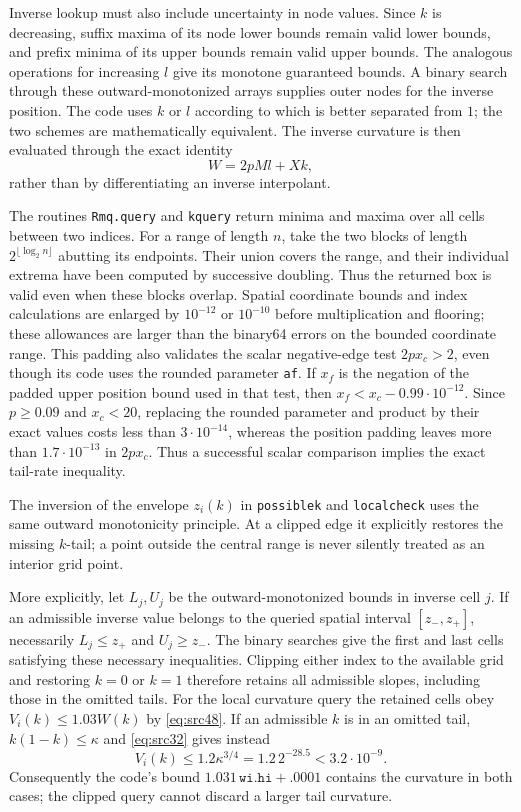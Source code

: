 \documentclass[11pt,a4paper]{article}
\numberwithin{equation}{section}
\theoremstyle{definition}
\theoremstyle{remark}
\begin{document}
Inverse lookup must also include uncertainty in node values.  Since $k$
is decreasing, suffix maxima of its node lower bounds remain valid lower
bounds, and prefix minima of its upper bounds remain valid upper bounds.
The analogous operations for increasing $l$ give its monotone guaranteed
bounds.  A binary search through these outward-monotonized arrays supplies
outer nodes for the inverse position.  The code uses $k$ or $l$ according to
which is better separated from $1$; the two schemes are mathematically
equivalent.  The inverse curvature is then evaluated through the exact
identity
\[
 W=2pMl+Xk,
\]
rather than by differentiating an inverse interpolant.

The routines \texttt{Rmq.query} and \texttt{kquery} return minima and maxima
over all cells between two indices.  For a range of length $n$, take the two
blocks of length $2^{\lfloor\log_2 n\rfloor}$ abutting its endpoints.  Their
union covers the range, and their individual extrema have been computed by
successive doubling.  Thus the returned box is valid even when these blocks
overlap.  Spatial coordinate bounds and index calculations are enlarged by
$10^{-12}$ or $10^{-10}$ before multiplication and flooring; these allowances
are larger than the binary64 errors on the bounded coordinate range.
This padding also validates the scalar negative-edge test
$2px_c>2$, even though its code uses the rounded parameter
\texttt{af}.  If $x_f$ is the negation of the padded upper position
bound used in that test, then $x_f<x_c-0.99\cdot10^{-12}$.
Since $p\ge0.09$ and $x_c<20$, replacing the rounded parameter and
product by their exact values costs less than $3\cdot10^{-14}$,
whereas the position padding leaves more than $1.7\cdot10^{-13}$
in $2px_c$.  Thus a successful scalar comparison implies the exact
tail-rate inequality.

The inversion of the envelope $z_i(k)$ in \texttt{possiblek} and
\texttt{localcheck} uses the same outward monotonicity principle.  At a clipped
edge it explicitly restores the missing $k$-tail; a point outside the central
range is never silently treated as an interior grid point.

More explicitly, let $L_j,U_j$ be the outward-monotonized bounds in inverse
cell $j$.  If an admissible inverse value belongs to the queried spatial
interval $[z_-,z_+]$, necessarily $L_j\le z_+$ and $U_j\ge z_-$.  The
binary searches give the first and last cells satisfying these necessary
inequalities.  Clipping either index to the available grid and restoring
$k=0$ or $k=1$ therefore retains all admissible slopes, including those in
the omitted tails.  For the local curvature query the retained cells obey
$V_i(k)\le1.03W(k)$ by \eqref{eq:src48}.  If an admissible $k$ is in an
omitted tail, $k(1-k)\le\kappa$ and \eqref{eq:src32} gives instead
\[
 V_i(k)\le1.2\kappa^{3/4}=1.2\,2^{-28.5}<3.2\cdot10^{-9}.
\]
Consequently the code's bound $1.031\,\texttt{wi.hi}+.0001$ contains the
curvature in both cases; the clipped query cannot discard a larger tail
curvature.
\end{document}
